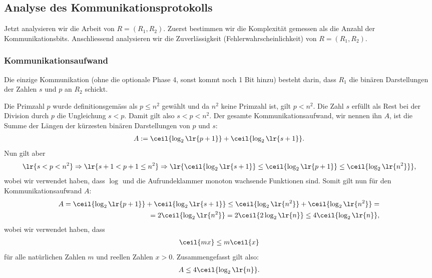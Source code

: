 \subsection{Analyse des Kommunikationsprotokolls}
Jetzt analysieren wir die Arbeit von $R = (R_1,R_2)$. Zuerst bestimmen wir die Komplexität gemessen als die Anzahl der Kommunikationsbits. Anschliessend analysieren wir die Zuverlässigkeit (Fehlerwahrscheinlichkeit) von $R = (R_1, R_2)$.
\subsubsection{Kommunikationsaufwand}
Die einzige Kommunikation (ohne die optionale Phase 4, sonst kommt noch 1 Bit hinzu) besteht darin, dass $R_1$ die binären Darstellungen der Zahlen $s$ und $p$ an $R_2$ schickt.

Die Primzahl $p$ wurde definitionsgemäss als $p \leq n^2$ gewählt und da $n^2$ keine Primzahl ist, gilt $p < n^2$. Die Zahl $s$ erfüllt als Rest bei der Division durch $p$ die Ungleichung $s < p$. Damit gilt also $s < p < n^2$. Der gesamte Kommunikationsaufwand, wir nennen ihn $A$, ist die Summe der Längen der kürzesten binären Darstellungen von $p$ und $s$:
\begin{align*}
	A := \ceil{\log_2\lr{p + 1}} + \ceil{\log_2\lr{s + 1}}.
\end{align*}
Nun gilt aber
\begin{align*}
	\lr{s < p < n^2} \Rightarrow \lr{s + 1 < p + 1 \leq n^2} \Rightarrow \lr{\ceil{\log_2\lr{s + 1}} \leq \ceil{\log_2\lr{p + 1}} \leq \ceil{\log_2\lr{n^2}}},
\end{align*}
wobei wir verwendet haben, dass $\log$ und die Aufrundeklammer monoton wachsende Funktionen sind. Somit gilt nun für den Kommunikationsaufwand $A$:
\begin{align*}
	A = \ceil{\log_2\lr{p + 1}} + \ceil{\log_2\lr{s + 1}} \leq \ceil{\log_2\lr{n^2}} + \ceil{\log_2\lr{n^2}} = \\
	= 2\ceil{\log_2\lr{n^2}} = 2\ceil{2\log_2\lr{n}} \leq 4\ceil{\log_2\lr{n}},
\end{align*}
wobei wir verwendet haben, dass
\begin{align*}
	\ceil{mx} \leq m\ceil{x}
\end{align*}
für alle natürlichen Zahlen $m$ und reellen Zahlen $x>0$. Zusammengefasst gilt also:
\begin{align*}
	A \leq 4\ceil{\log_2\lr{n}}.
\end{align*}

